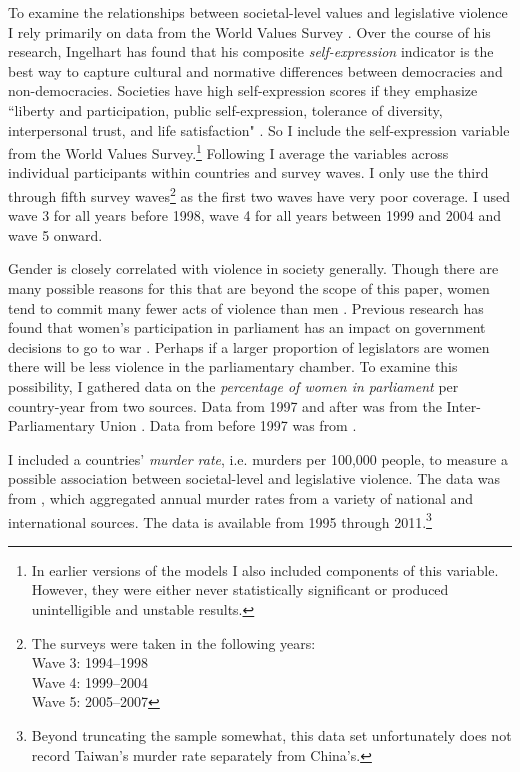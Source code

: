 \documentclass[a4paper]{article}\usepackage[]{graphicx}\usepackage[]{color}
\begin{document}
To examine the relationships between societal-level values and legislative violence I rely primarily on data from the World Values Survey \citeyearpar{WVS2009}. Over the course of his research, Ingelhart has found that his composite {\emph{self-expression}} indicator is the best way to capture cultural and normative differences between democracies and non-democracies. Societies have high self-expression scores if they emphasize ``liberty and participation, public self-expression, tolerance of diversity, interpersonal trust, and life satisfaction" \citep[64]{Inglehart2003}. So I include the self-expression variable from the World Values Survey.\footnote{In earlier versions of the models I also included components of this variable. However, they were either never statistically significant or produced unintelligible and unstable results.} Following \cite{Inglehart2003} I average the variables across individual participants within countries and survey waves. I only use the third through fifth survey waves\footnote{The surveys were taken in the following years: \\ Wave 3: 1994--1998 \\ Wave 4: 1999--2004 \\ Wave 5: 2005--2007} as the first two waves have very poor coverage. I used wave 3 for all years before 1998, wave 4 for all years between 1999 and 2004 and wave 5 onward.

Gender is closely correlated with violence in society generally. Though there are many possible reasons for this that are beyond the scope of this paper, women tend to commit many fewer acts of violence than men \citep[see][]{Schwartz2009}. Previous research has found that women's participation in parliament has an impact on government decisions to go to war \citep{Melander2005}. Perhaps if a larger proportion of legislators are women there will be less violence in the parliamentary chamber. To examine this possibility, I gathered data on the \emph{percentage of women in parliament} per country-year from two sources. Data from 1997 and after was from the Inter-Parliamentary Union \citeyearpar{IPU2013}. Data from before 1997 was from \cite{Schwartz2009}.

I included a countries' \emph{murder rate}, i.e. murders per 100,000 people, to measure a possible association between societal-level and legislative violence. The data was from \cite{UNMurder2013}, which aggregated annual murder rates from a variety of national and international sources. The data is available from 1995 through 2011.\footnote{Beyond truncating the sample somewhat, this data set unfortunately does not record Taiwan's murder rate separately from China's.}
\end{document}
